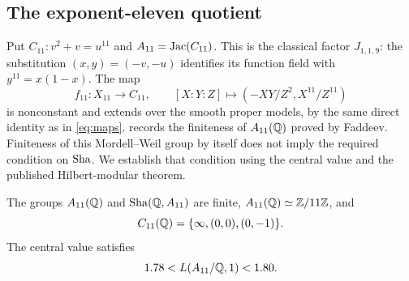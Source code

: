 \subsection{The exponent-eleven quotient}
\label{subsec:eleven}

Put $C_{11}:v^2+v=u^{11}$ and $A_{11}=\operatorname{Jac}(C_{11})$.
This is the classical factor $J_{1,1,9}$: the substitution
$(x,y)=(-v,-u)$ identifies its function field with
$y^{11}=x(1-x)$. The map
\[
f_{11}:X_{11}\longrightarrow C_{11},\qquad
[X:Y:Z]\longmapsto(-XY/Z^2,X^{11}/Z^{11})
\]
is nonconstant and extends over the smooth proper models, by the
same direct identity as in \eqref{eq:maps}.
\citet[\S4, table on p.~219]{GrossRohrlich1978} records the finiteness
of $A_{11}(\mathbb Q)$ proved by Faddeev. Finiteness of this Mordell--Weil
group by itself does not imply the required condition on $\operatorname{Sha}$.
We establish that condition using the central value and the published
Hilbert-modular theorem.

\begin{proposition}\label{prop:eleven}
The groups $A_{11}(\mathbb Q)$ and $\operatorname{Sha}(\mathbb Q,A_{11})$ are finite,
$A_{11}(\mathbb Q)\simeq\mathbb Z/11\mathbb Z$, and
\[
C_{11}(\mathbb Q)=\{\infty,(0,0),(0,-1)\}.
\]
The central value satisfies
\begin{equation}
1.78<L(A_{11}/\mathbb Q,1)<1.80.
\label{eq:elevenvalue}
\end{equation}
\end{proposition}

